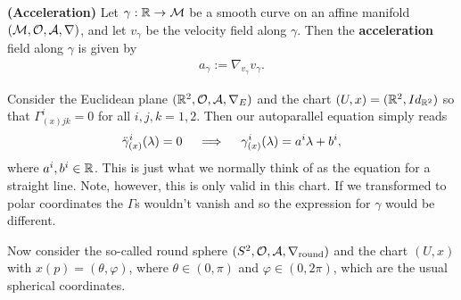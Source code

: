 \documentclass[12pt]{article} %
\newcommand{\bfs}[1]{\textbf{({#1}) }}
\begin{document}
\bd\bfs{Acceleration}
    Let $\gamma:\mathbb{R}\to\mathcal{M}$ be a smooth curve on an affine manifold $(\mathcal{M},\mathcal{O},\mathcal{A},\nabla)$, and let $v_{\gamma}$ be the velocity field along $\gamma$. Then the \textbf{acceleration} field along $\gamma$ is given by 
    \begin{align*}
        a_{\gamma} := \nabla_{v_{\gamma}} v_{\gamma}.
    \end{align*}
\ed 

\bex 
    Consider the Euclidean plane $(\mathbb{R}^2,\mathcal{O},\mathcal{A},\nabla_E)$ and the chart $(U,x) = (\mathbb{R}^2,Id_{\mathbb{R}^2})$ so that $\Gamma^i_{(x)jk}=0$ for all $i,j,k=1,2$. Then our autoparallel equation simply reads 
    \begin{align*}
        \Ddot{\gamma}^i_{(x)}(\lambda) = 0 \quad \implies \quad \gamma^i_{(x)}(\lambda) = a^i\lambda + b^i,
    \end{align*}
    where $a^i,b^i\in\mathbb{R}$. This is just what we normally think of as the equation for a straight line. Note, however, this is only valid in this chart. If we transformed to polar coordinates the $\Gamma$s wouldn't vanish and so the expression for $\gamma$ would be different.
\eex 

\bex 
    Now consider the so-called round sphere $(S^2,\mathcal{O},\mathcal{A},\nabla_{\text{round}})$ and the chart $(U,x)$ with $x(p) = (\theta,\varphi)$, where $\theta \in (0,\pi)$ and $\varphi\in(0,2\pi)$, which are the usual spherical coordinates.
    
\end{document}
